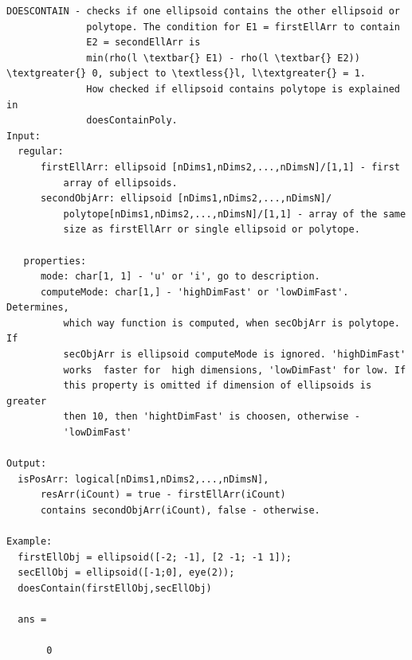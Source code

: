 \documentclass[letterpaper,10pt,english]{sphinxmanual}
\begin{document}
\begin{Verbatim}[commandchars=\\\{\}]
DOESCONTAIN - checks if one ellipsoid contains the other ellipsoid or
              polytope. The condition for E1 = firstEllArr to contain
              E2 = secondEllArr is
              min(rho(l \textbar{} E1) - rho(l \textbar{} E2)) \textgreater{} 0, subject to \textless{}l, l\textgreater{} = 1.
              How checked if ellipsoid contains polytope is explained in
              doesContainPoly.
Input:
  regular:
      firstEllArr: ellipsoid [nDims1,nDims2,...,nDimsN]/[1,1] - first
          array of ellipsoids.
      secondObjArr: ellipsoid [nDims1,nDims2,...,nDimsN]/
          polytope[nDims1,nDims2,...,nDimsN]/[1,1] - array of the same
          size as firstEllArr or single ellipsoid or polytope.

   properties:
      mode: char[1, 1] - 'u' or 'i', go to description.
      computeMode: char[1,] - 'highDimFast' or 'lowDimFast'. Determines,
          which way function is computed, when secObjArr is polytope. If
          secObjArr is ellipsoid computeMode is ignored. 'highDimFast'
          works  faster for  high dimensions, 'lowDimFast' for low. If
          this property is omitted if dimension of ellipsoids is greater
          then 10, then 'hightDimFast' is choosen, otherwise -
          'lowDimFast'

Output:
  isPosArr: logical[nDims1,nDims2,...,nDimsN],
      resArr(iCount) = true - firstEllArr(iCount)
      contains secondObjArr(iCount), false - otherwise.

Example:
  firstEllObj = ellipsoid([-2; -1], [2 -1; -1 1]);
  secEllObj = ellipsoid([-1;0], eye(2));
  doesContain(firstEllObj,secEllObj)

  ans =

       0
\end{Verbatim}
\end{document}
